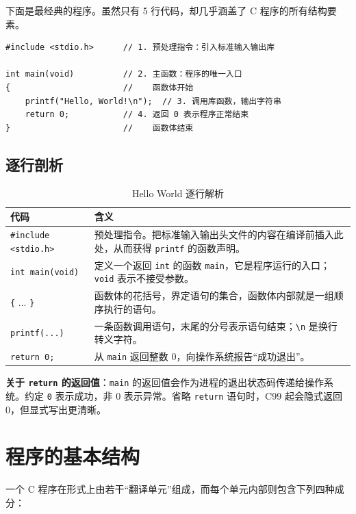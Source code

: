 下面是最经典的程序。虽然只有 5 行代码，却几乎涵盖了 C 程序的所有结构要素。

\begin{lstlisting}[caption={Hello World 完整程序}]
#include <stdio.h>      // 1. 预处理指令：引入标准输入输出库

int main(void)          // 2. 主函数：程序的唯一入口
{                       //    函数体开始
    printf("Hello, World!\n");  // 3. 调用库函数，输出字符串
    return 0;           // 4. 返回 0 表示程序正常结束
}                       //    函数体结束
\end{lstlisting}

\subsection{逐行剖析}

\begin{table}[H]
\centering
\caption{Hello World 逐行解析}
\label{tab:hello_lines}
\begin{tabularx}{\textwidth}{@{}l X@{}}
\toprule
\textbf{代码} & \textbf{含义} \\
\midrule
\texttt{\#include <stdio.h>} & 预处理指令。把标准输入输出头文件的内容在编译前插入此处，从而获得 \texttt{printf} 的函数声明。 \\
\texttt{int main(void)} & 定义一个返回 \texttt{int} 的函数 \texttt{main}，它是程序运行的入口；\texttt{void} 表示不接受参数。 \\
\texttt{\{} ... \texttt{\}} & 函数体的花括号，界定语句的集合，函数体内部就是一组顺序执行的语句。 \\
\texttt{printf(...)} & 一条函数调用语句，末尾的分号表示语句结束；\texttt{\textbackslash n} 是换行转义字符。 \\
\texttt{return 0;} & 从 \texttt{main} 返回整数 0，向操作系统报告“成功退出”。 \\
\bottomrule
\end{tabularx}
\end{table}

\textbf{关于 \texttt{return} 的返回值}：\texttt{main} 的返回值会作为进程的退出状态码传递给操作系统。约定 \texttt{0} 表示成功，非 0 表示异常。省略 \texttt{return} 语句时，C99 起会隐式返回 0，但显式写出更清晰。

\section{程序的基本结构}

一个 C 程序在形式上由若干“翻译单元”组成，而每个单元内部则包含下列四种成分：

